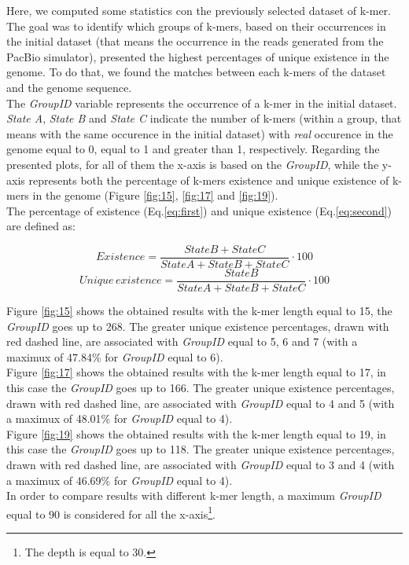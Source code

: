 \documentclass[11pt]{article}
\begin{document}
Here, we computed some statistics con the previously selected dataset of k-mer.
The goal was to identify which groups of k-mers, based on their occurrences in the initial dataset (that means the occurrence in the reads generated from the PacBio simulator), presented the highest percentages of unique existence in the genome.
To do that, we found the matches between each k-mers of the dataset and the genome sequence.\\
The \emph{GroupID} variable represents the occurrence of a k-mer in the initial dataset. 
\emph{State A}, \emph{State B} and \emph{State C} indicate the number of k-mers (within a group, that means with the same occurence in the initial dataset) with \emph{real} occurence in the genome equal to 0, equal to 1 and greater than 1, respectively.
Regarding the presented plots, for all of them the x-axis is based on the \emph{GroupID}, while the y-axis represents both the percentage of k-mers existence and unique existence of k-mers in the genome (Figure \ref{fig:15}, \ref{fig:17} and \ref{fig:19}).\\
The percentage of existence (Eq.\ref{eq:first}) and unique existence (Eq.\ref{eq:second}) are defined as:
\vspace{5mm}

\begin{equation}
Existence = \frac{State B + State C}{State A + State B + State C}\cdot 100
\label{eq:first}
\end{equation}
\begin{equation}
Unique\, existence = \frac{StateB}{StateA + StateB + StateC}\cdot 100
\label{eq:second}
\end{equation}

\vspace{6mm}
\noindent
Figure \ref{fig:15} shows the obtained results with the k-mer length equal to 15, the \emph{GroupID} goes up to 268.
The greater unique existence percentages, drawn with red dashed line, are associated with \emph{GroupID} equal to 5, 6 and 7 (with a maximux of 47.84\% for \emph{GroupID} equal to 6).\\
Figure \ref{fig:17} shows the obtained results with the k-mer length equal to 17, in this case the \emph{GroupID} goes up to 166.
The greater unique existence percentages, drawn with red dashed line, are associated with \emph{GroupID} equal to 4 and 5 (with a maximux of 48.01\% for \emph{GroupID} equal to 4).\\
Figure \ref{fig:19} shows the obtained results with the k-mer length equal to 19, in this case the \emph{GroupID} goes up to 118.
The greater unique existence percentages, drawn with red dashed line, are associated with \emph{GroupID} equal to 3 and 4 (with a maximux of 46.69\% for \emph{GroupID} equal to 4).\\
In order to compare results with different k-mer length, a maximum \emph{GroupID} equal to 90 is considered for all the x-axis\footnote{The depth is equal to 30.}.
\end{document}
